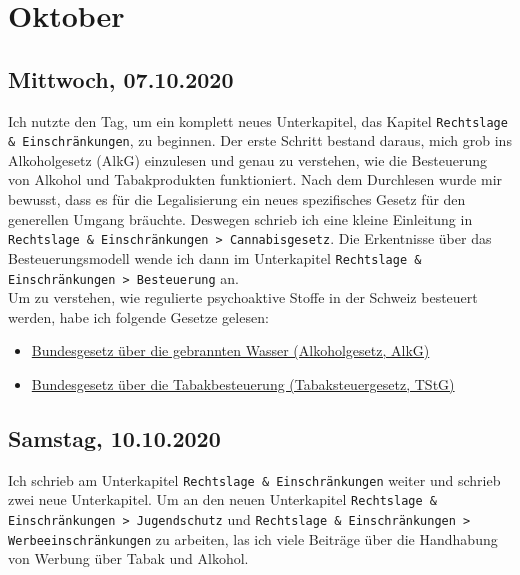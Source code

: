 \documentclass[../main.tex]{subfiles}
\begin{document}
	\section{Oktober}
	
	\subsection{Mittwoch, 07.10.2020}
	Ich nutzte den Tag, um ein komplett neues Unterkapitel, das Kapitel \texttt{Rechtslage \& Einschränkungen}, zu beginnen. 
	Der erste Schritt bestand daraus, mich grob ins Alkoholgesetz (AlkG) einzulesen und genau zu verstehen, wie die Besteuerung von Alkohol und Tabakprodukten funktioniert. 
	Nach dem Durchlesen wurde mir bewusst, dass es für die Legalisierung ein neues spezifisches Gesetz für den generellen Umgang bräuchte. Deswegen schrieb ich eine kleine Einleitung in \texttt{Rechtslage \& Einschränkungen > Cannabisgesetz}.
	Die Erkentnisse über das Besteuerungsmodell wende ich dann im Unterkapitel \texttt{Rechtslage \& Einschränkungen > Besteuerung} an.\\
	
	\noindent	
	Um zu verstehen, wie regulierte psychoaktive Stoffe in der Schweiz besteuert werden, habe ich folgende Gesetze gelesen:
	
	\begin{itemize}
		\item \href{https://www.admin.ch/opc/de/classified-compilation/19320035/index.html}{Bundesgesetz über die gebrannten Wasser (Alkoholgesetz, AlkG)}
		\item \href{https://www.admin.ch/opc/de/classified-compilation/19690056/index.html}{Bundesgesetz über die Tabakbesteuerung (Tabaksteuergesetz, TStG)}
	\end{itemize}
	
	
	\subsection{Samstag, 10.10.2020}
	Ich schrieb am Unterkapitel \texttt{Rechtslage \& Einschränkungen} weiter und schrieb zwei neue Unterkapitel.
	Um an den neuen Unterkapitel \texttt{Rechtslage \& Einschränkungen > Jugendschutz} und \texttt{Rechtslage \& Einschränkungen > Werbeeinschränkungen} zu arbeiten, las ich viele Beiträge über die Handhabung von Werbung über Tabak und Alkohol. 
	 
	
	
\end{document}
